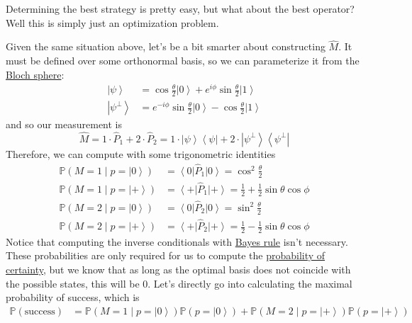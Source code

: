 \documentclass{article}
\newcommand{\ket}[1]{\ensuremath{\left|#1\right\rangle}}
\newcommand{\bra}[1]{\ensuremath{\left\langle#1\right|}}
\newcounter{example}[section]
\begin{document}
    Determining the best strategy is pretty easy, but what about the best operator? Well this is simply just an optimization problem. 

    \begin{example}
      \label{ex:best-operator-for-distinguishing-two-non}
      Given the same situation above, let's be a bit smarter about constructing $\hat{M}$. It must be defined over some orthonormal basis, so we can parameterize it from the \hyperref[def:bloch-sphere]{Bloch sphere}: 
      \begin{align}
        \ket{\psi} & = \cos\frac{\theta}{2} \ket{0} + e^{i \phi} \sin\frac{\theta}{2} \ket{1} \\
        \ket{\psi^\perp} & = e^{-i \phi} \sin\frac{\theta}{2} \ket{0} - \cos\frac{\theta}{2} \ket{1}
      \end{align}
      and so our measurement is 
      \begin{equation}
        \hat{M} = 1 \cdot \hat{P}_1 + 2 \cdot \hat{P}_2 = 1 \cdot \ket{\psi} \bra{\psi} + 2 \cdot \ket{\psi^\perp} \bra{\psi^\perp}
      \end{equation}
      Therefore, we can compute with some trigonometric identities 
      \begin{align}
        \mathbb{P}(M = 1 \mid p = \ket{0}) & = \bra{0} \hat{P}_1 \ket{0} = \cos^2 \frac{\theta}{2} \\ 
        \mathbb{P}(M = 1 \mid p = \ket{+}) & = \bra{+} \hat{P}_1 \ket{+} = \frac{1}{2} + \frac{1}{2} \sin{\theta} \cos{\phi} \\ 
        \mathbb{P}(M = 2 \mid p = \ket{0}) & = \bra{0} \hat{P}_2 \ket{0} = \sin^2 \frac{\theta}{2} \\ 
        \mathbb{P}(M = 2 \mid p = \ket{+}) & = \bra{+} \hat{P}_2 \ket{+} = \frac{1}{2} - \frac{1}{2} \sin{\theta} \cos{\phi}
      \end{align}
      Notice that computing the inverse conditionals with \hyperref[prob-thm:bayes-rule]{Bayes rule} isn't necessary. These probabilities are only required for us to compute the \hyperref[def:probability-of-certainty]{probability of certainty}, but we know that as long as the optimal basis does not coincide with the possible states, this will be $0$. Let's directly go into calculating the maximal probability of success, which is 
      \begin{align}
        \mathbb{P}(\text{success}) & = \mathbb{P}(M = 1 \mid p = \ket{0}) \mathbb{P}(p = \ket{0}) + \mathbb{P}(M = 2 \mid p = \ket{+}) \mathbb{P}(p = \ket{+}) \\

\end{align}
\end{example}
\end{document}
